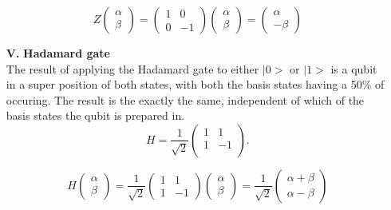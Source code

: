 \documentclass[onecolumn,10pt,cleanfoot]{asme2ej}
\begin{document}
\begin{enumerate}
		\begin{equation*}
			Z \begin{pmatrix}
			\alpha \\
			\beta
			\end{pmatrix}
			=
			\begin{pmatrix}
			1 & 0 \\
			0 & -1
			\end{pmatrix}
			\begin{pmatrix}
			\alpha \\
			\beta
			\end{pmatrix}
			=
			\begin{pmatrix}
			\alpha \\
			-\beta
			\end{pmatrix}
	\end{equation*} 

	\item[\textbf{V.}] \textbf{Hadamard gate} \\
		The result of applying the Hadamard gate to either $|0>$ or $|1>$ is a qubit in a super position of both states, with both the basis states having a 50\% of occuring. The result is the exactly the same, independent of which of the basis states the qubit is prepared in. 
		\begin{equation*}
			H = \frac{1}{\sqrt{2}} \begin{pmatrix}
			1 & 1 \\
			1 & -1 \\
		\end{pmatrix}.
	\end{equation*}

		\begin{equation*}
			H \begin{pmatrix}
			\alpha \\
			\beta
			\end{pmatrix}
			=
			\frac{1}{\sqrt{2}}\begin{pmatrix}
			1 & 1 \\
			1 & -1
			\end{pmatrix}
			\begin{pmatrix}
			\alpha \\
			\beta
			\end{pmatrix}
			=
			\frac{1}{\sqrt{2}}\begin{pmatrix}
			\alpha + \beta \\
			\alpha - \beta
			\end{pmatrix}
	\end{equation*}


\end{enumerate}
\end{document}
